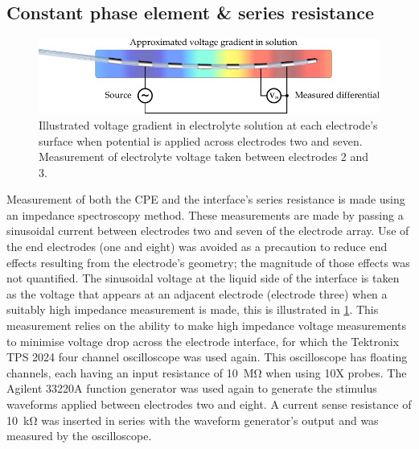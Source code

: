 

    \subsection{Constant phase element \& series resistance}


      \begin{figure}
        \centering
        \includegraphics{content/pt2/08-InterfaceParameters/graphics/measurement_CPE}
        \caption{\label{fig:pt2-measurement_CPE}Illustrated voltage gradient in electrolyte solution at each electrode's surface when potential is applied across electrodes two and seven. Measurement of electrolyte voltage taken between electrodes 2 and 3.}
      \end{figure}
      Measurement of both the CPE and the interface's series resistance is made using an impedance spectroscopy method.
      These measurements are made by passing a sinusoidal current between electrodes two and seven of the electrode array.
      Use of the end electrodes (one and eight) was avoided as a precaution to reduce end effects resulting from the electrode's geometry; the magnitude of those effects was not quantified.
      The sinusoidal voltage at the liquid side of the interface is taken as the voltage that appears at an adjacent electrode (electrode three) when a suitably high impedance measurement is made, this is illustrated in \cref{fig:pt2-measurement_CPE}.
      This measurement relies on the ability to make high impedance voltage measurements to minimise voltage drop across the electrode interface, for which the Tektronix TPS 2024 four channel oscilloscope was used again.
      This oscilloscope has floating channels, each having an input resistance of \SI{10}{\mega\ohm} when using 10X probes.
      The Agilent 33220A function generator was used again to generate the stimulus waveforms applied between electrodes two and eight.
      A current sense resistance of \SI{10}{\kilo\ohm} was inserted in series with the waveform generator's output and was measured by the oscilloscope.
